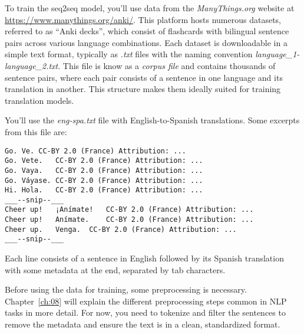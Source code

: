 To train the seq2seq model, you'll use data from the \emph{ManyThings.org} website at \url{https://www.manythings.org/anki/}. This platform hosts numerous datasets, referred to as ``Anki decks'', which consist of flashcards with bilingual sentence pairs across various language combinations. Each dataset is downloadable in a simple text format, typically as \emph{.txt} files with the naming convention \emph{language\_1-language\_2.txt}. This file is know as a \emph{corpus file} and contains thousands of sentence pairs, where each pair consists of a sentence in one language and its translation in another. This structure makes them ideally suited for training translation models.

You'll use the \emph{eng-spa.txt} file with English-to-Spanish translations.
Some excerpts from this file are:
\begin{lstlisting}
Go.	Ve.	CC-BY 2.0 (France) Attribution: ...
Go.	Vete.	CC-BY 2.0 (France) Attribution: ...
Go.	Vaya.	CC-BY 2.0 (France) Attribution: ...
Go.	Váyase.	CC-BY 2.0 (France) Attribution: ...
Hi.	Hola.	CC-BY 2.0 (France) Attribution: ...
___--snip--___
Cheer up!	¡Anímate!	CC-BY 2.0 (France) Attribution: ...
Cheer up!	Anímate.	CC-BY 2.0 (France) Attribution: ...
Cheer up.	Venga.	CC-BY 2.0 (France) Attribution: ...
___--snip--___
\end{lstlisting}
Each line consists of a sentence in English followed by its Spanish translation with some metadata at the end, separated by tab characters.

Before using the data for training, some preprocessing is necessary. Chapter~\ref{ch:08} will explain the different preprocessing steps common in NLP tasks in more detail. For now, you need to tokenize and filter the sentences to remove the metadata and ensure the text is in a clean, standardized format. 


